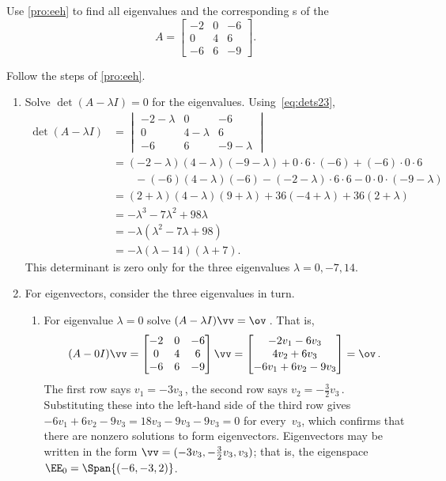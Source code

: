 \begin{example} \label{eg:3x3hande}
Use \cref{pro:eeh} to find all eigenvalues and the corresponding s of the 
\begin{equation*}
A=\begin{bmatrix} -2&0&-6\\0&4&6\\-6&6&-9 \end{bmatrix}.
\end{equation*}

\begin{solution} 
Follow the steps of \cref{pro:eeh}.
\begin{enumerate}
\item Solve \(\det(A-\lambda I)=0\) for the eigenvalues.
Using~\eqref{eq:dets23},
\begin{align*}
\det(A-\lambda I)
&= \begin{vmatrix} -2-\lambda&0&-6\\0&4-\lambda&6\\-6&6&-9-\lambda \end{vmatrix}
\\&=(-2-\lambda)(4-\lambda)(-9-\lambda)+0\cdot6\cdot(-6)+(-6)\cdot0\cdot 6
\\&\qquad{}
-(-6)(4-\lambda)(-6)-(-2-\lambda)\cdot6\cdot6-0\cdot0\cdot(-9-\lambda)
\\&=(2+\lambda)(4-\lambda)(9+\lambda)+36(-4+\lambda)+36(2+\lambda)
\\&=-\lambda^3-7\lambda^2+98\lambda
\\&=-\lambda(\lambda^2-7\lambda+98)
\\&=-\lambda(\lambda-14)(\lambda+7).
\end{align*}
This determinant is zero only for the three eigenvalues \(\lambda=0,-7,14\).

\item For eigenvectors, consider the three eigenvalues in turn.
\begin{enumerate}
\item For eigenvalue \(\lambda=0\) solve \((A-\lambda I)\vv=\ov\)\,.  
That is,
\begin{equation*}
(A-0I)\vv
=\begin{bmatrix} -2&0&-6\\0&4&6\\-6&6&-9 \end{bmatrix}\vv
=\begin{bmatrix} -2v_1-6v_3\\4v_2+6v_3\\-6v_1+6v_2-9v_3 \end{bmatrix}
=\ov\,.
\end{equation*}
The first row says \(v_1=-3v_3\)\,, the second row says \(v_2=-\frac32v_3\)\,.  
Substituting these into the left-hand side of the third row gives
\(-6v_1+6v_2-9v_3=18v_3-9v_3-9v_3=0\) for every~\(v_3\), which confirms that there are nonzero solutions to form eigenvectors.
Eigenvectors may be written in the form \(\vv=(-3v_3,-\frac32v_3,v_3)\); that is, the eigenspace \(\EE_0=\Span\{(-6,-3,2)\}\).


\end{enumerate}
\end{enumerate}
\end{solution}
\end{example}
